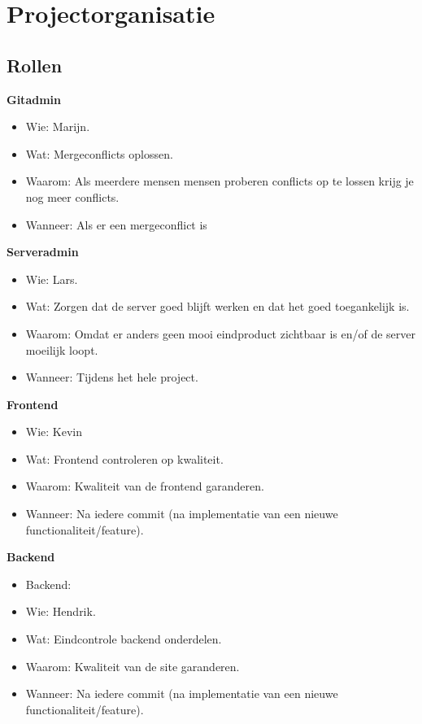 \documentclass{uva-inf-article}
\begin{document}
\newpage
\section{Projectorganisatie}

\subsection{Rollen}
\textbf{Gitadmin}
\begin{itemize}[noitemsep]
    \item Wie: Marijn.
    \item Wat: Mergeconflicts oplossen.
    \item Waarom: Als meerdere mensen mensen proberen conflicts op te lossen krijg je nog meer conflicts.
    \item Wanneer: Als er een mergeconflict is
\end{itemize}

\textbf{Serveradmin}
\begin{itemize}[noitemsep]
    \item Wie: Lars.
    \item Wat: Zorgen dat de server goed blijft werken en dat het goed toegankelijk is.
    \item Waarom: Omdat er anders geen mooi eindproduct zichtbaar is en/of de server moeilijk loopt.
    \item Wanneer: Tijdens het hele project.
\end{itemize}

\textbf{Frontend}
\begin{itemize}[noitemsep]
    \item Wie: Kevin
    \item Wat: Frontend controleren op kwaliteit.
    \item Waarom: Kwaliteit van de frontend garanderen.
    \item Wanneer: Na iedere commit (na implementatie van een nieuwe functionaliteit/feature).
\end{itemize}

\textbf{Backend}
\begin{itemize}[noitemsep]
    \item Backend:
    \item Wie: Hendrik.
    \item Wat: Eindcontrole backend onderdelen.
    \item Waarom: Kwaliteit van de site garanderen.
    \item Wanneer: Na iedere commit (na implementatie van een nieuwe functionaliteit/feature).
\end{itemize}
\end{document}
